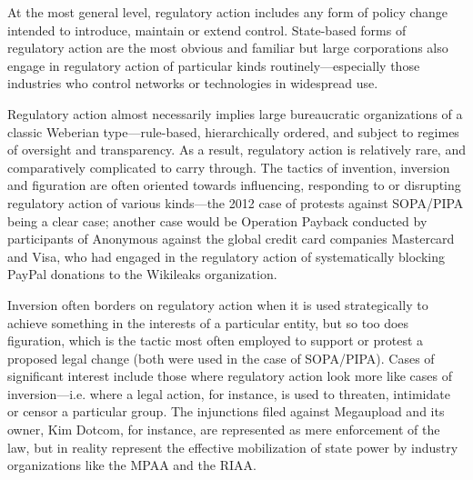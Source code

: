 \documentclass[10pt,letter,oneside]{scrartcl}
\begin{document}
At the most general level, regulatory action includes any form of policy change
intended to introduce, maintain or extend control.  State-based forms of
regulatory action are the most obvious and familiar but large corporations also
engage in regulatory action of particular kinds routinely---especially those
industries who control networks or technologies in widespread use.

Regulatory action almost necessarily implies large bureaucratic organizations of
a classic Weberian type---rule-based, hierarchically ordered, and subject to
regimes of oversight and transparency.  As a result, regulatory action is
relatively rare, and comparatively complicated to carry through.  The tactics of
invention, inversion and figuration are often oriented towards influencing,
responding to or disrupting regulatory action of various kinds---the 2012 case
of protests against SOPA/PIPA being a clear case; another case would be
Operation Payback conducted by participants of Anonymous against the global 
credit card companies Mastercard and Visa, who had engaged in the regulatory 
action of systematically blocking PayPal donations to the Wikileaks organization.


Inversion often borders on regulatory action when it is used strategically to
achieve something in the interests of a particular entity, but so too does
figuration, which is the tactic most often employed to support or protest
a proposed legal change (both were used in the case of SOPA/PIPA).  Cases of
significant interest include those where regulatory action look more like cases
of inversion---i.e. where a legal action, for instance, is used to threaten,
intimidate or censor a particular group. The injunctions filed against
Megaupload and its owner, Kim Dotcom, for instance, are represented as mere 
enforcement of the law, but in reality represent the effective mobilization 
of state power by industry organizations like the MPAA and the RIAA.
\end{document}
